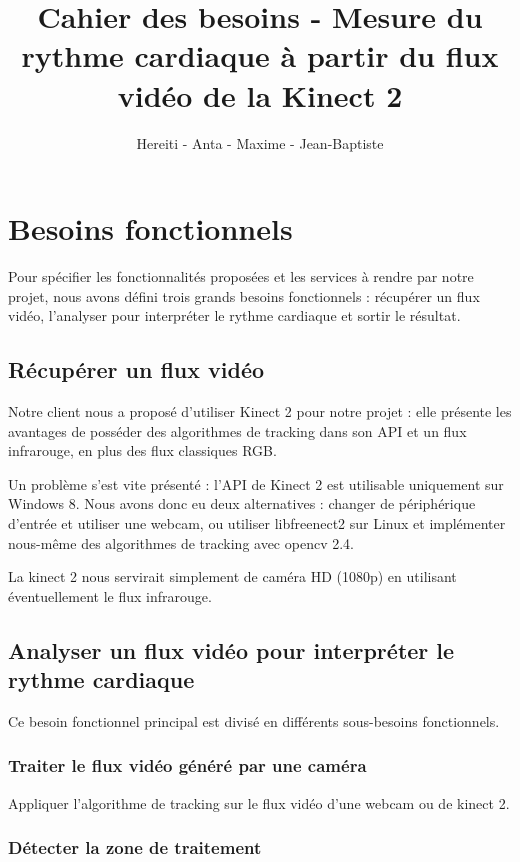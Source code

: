 \documentclass[12pt,a4paper]{article}
\title{Cahier des besoins - Mesure du rythme cardiaque à partir du flux vidéo de la Kinect 2}
\author{Hereiti \bsc{Hatitio} - Anta \bsc{Mbaye} - Maxime \bsc{Vincent} - Jean-Baptiste \bsc{Rey}}
\begin{document}
\maketitle

\tableofcontents
\newpage
\section{Besoins fonctionnels}
Pour spécifier les fonctionnalités proposées et les services à rendre par notre projet, nous avons défini trois grands besoins fonctionnels : récupérer un flux vidéo, l'analyser pour interpréter le rythme cardiaque et sortir le résultat.

\subsection{Récupérer un flux vidéo}
Notre client nous a proposé d'utiliser Kinect 2 pour notre projet : elle présente les avantages de posséder des algorithmes de tracking dans son API et un flux infrarouge, en plus des flux classiques RGB.

Un problème s'est vite présenté : l'API de Kinect 2 est utilisable uniquement sur Windows 8. Nous avons donc eu deux alternatives : changer de périphérique d'entrée et utiliser une webcam, ou utiliser libfreenect2 sur Linux et implémenter nous-même des algorithmes de tracking avec opencv 2.4.

La kinect 2 nous servirait simplement de caméra HD (1080p) en utilisant éventuellement le flux infrarouge.

\subsection{Analyser un flux vidéo pour interpréter le rythme cardiaque}
Ce besoin fonctionnel principal est divisé en différents sous-besoins fonctionnels.

\subsubsection{Traiter le flux vidéo généré par une caméra}

Appliquer l'algorithme de tracking sur le flux vidéo d'une webcam ou de kinect 2.

\subsubsection{Détecter la zone de traitement}
\end{document}
